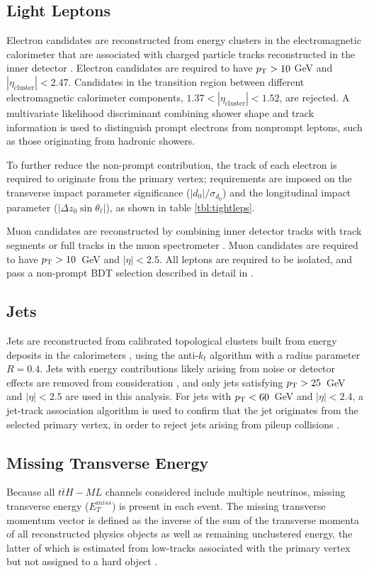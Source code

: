 \subsection{Light Leptons}
\label{subsec:lepSelection}

Electron candidates are reconstructed from energy clusters in the electromagnetic calorimeter that are associated with charged particle tracks reconstructed in the inner detector \cite{ATLAS-CONF-2016-024}.  Electron candidates are required to have $p_{\text{T}} > 10$ GeV and $|\eta_\textrm{cluster}| < 2.47$. Candidates in the transition region between different electromagnetic calorimeter components, $1.37 < |\eta_\textrm{cluster}| < 1.52$, are rejected. A multivariate likelihood discriminant combining shower shape and track information is used to distinguish prompt electrons from nonprompt leptons, such as those originating from hadronic showers. 

To further reduce the non-prompt contribution, the track of each electron is required to originate from the primary vertex; requirements are imposed on the transverse impact parameter significance ($|d_0|/\sigma_{d_0}$) and the longitudinal impact parameter ($|\Delta z_0 \sin \theta_\ell|$), as shown in table \ref{tbl:tightleps}.

Muon candidates are reconstructed by combining inner detector tracks with track segments or full tracks in the muon spectrometer \cite{PERF-2014-05}. Muon candidates are required to have $p_{\text{T}} > 10$~GeV and $|\eta| < 2.5$. All leptons are required to be isolated, and pass a non-prompt BDT selection described in detail in \cite{ttH_paper}.

\subsection{Jets}
\label{subsec:jetSelection}

Jets are reconstructed from calibrated topological clusters built from energy deposits in the calorimeters \cite{ATL-PHYS-PUB-2015-015}, using the anti-$k_t$ algorithm with a radius parameter $R=0.4$.  Jets with energy contributions likely arising from noise or detector effects are removed from consideration \cite{ATLAS-CONF-2015-029}, and only jets satisfying $p_{\text{T}} > 25$~GeV and $|\eta| < 2.5$ are used in this analysis.  For jets with $p_{\text{T}} < 60$~GeV and $|\eta| < 2.4$, a jet-track association algorithm is used to confirm that the jet originates from the selected primary vertex, in order to reject jets arising from pileup collisions \cite{PERF-2014-03}. 

\subsection{Missing Transverse Energy}

Because all $t\bar{t}H-ML$ channels considered include multiple neutrinos, missing transverse energy ($E_T^{miss}$) is present in each event. The missing transverse momentum vector is defined as the inverse of the sum of the transverse momenta of all reconstructed physics objects as well as remaining unclustered energy, the latter of which is estimated from low-\pt tracks associated with the primary vertex but not assigned to a hard object \cite{ATL-PHYS-PUB-2015-027}.
